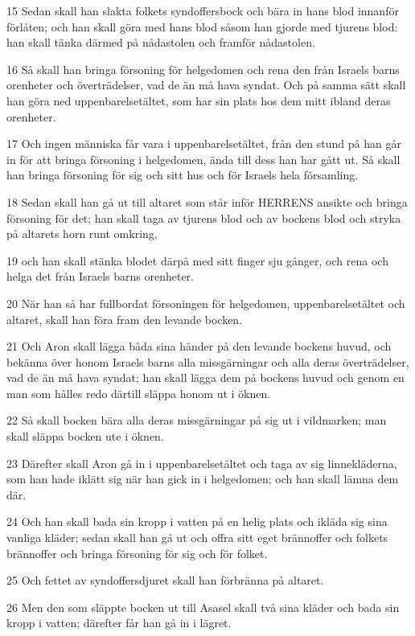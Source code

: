 \par 15 Sedan skall han slakta folkets syndoffersbock och bära in hans blod innanför förlåten; och han skall göra med hans blod såsom han gjorde med tjurens blod: han skall tänka därmed på nådastolen och framför nådastolen.
\par 16 Så skall han bringa försoning för helgedomen och rena den från Israels barns orenheter och överträdelser, vad de än må hava syndat. Och på samma sätt skall han göra ned uppenbarelsetältet, som har sin plats hos dem mitt ibland deras orenheter.
\par 17 Och ingen människa får vara i uppenbarelsetältet, från den stund på han går in för att bringa försoning i helgedomen, ända till dess han har gått ut. Så skall han bringa försoning för sig och sitt hus och för Israels hela församling.
\par 18 Sedan skall han gå ut till altaret som står inför HERRENS ansikte och bringa försoning för det; han skall taga av tjurens blod och av bockens blod och stryka på altarets horn runt omkring,
\par 19 och han skall stänka blodet därpå med sitt finger sju gånger, och rena och helga det från Israels barns orenheter.
\par 20 När han så har fullbordat försoningen för helgedomen, uppenbarelsetältet och altaret, skall han föra fram den levande bocken.
\par 21 Och Aron skall lägga båda sina händer på den levande bockens huvud, och bekänna över honom Israels barns alla missgärningar och alla deras överträdelser, vad de än må hava syndat; han skall lägga dem på bockens huvud och genom en man som hålles redo därtill släppa honom ut i öknen.
\par 22 Så skall bocken bära alla deras missgärningar på sig ut i vildmarken; man skall släppa bocken ute i öknen.
\par 23 Därefter skall Aron gå in i uppenbarelsetältet och taga av sig linnekläderna, som han hade iklätt sig när han gick in i helgedomen; och han skall lämna dem där.
\par 24 Och han skall bada sin kropp i vatten på en helig plats och ikläda sig sina vanliga kläder; sedan skall han gå ut och offra sitt eget brännoffer och folkets brännoffer och bringa försoning för sig och för folket.
\par 25 Och fettet av syndoffersdjuret skall han förbränna på altaret.
\par 26 Men den som släppte bocken ut till Asasel skall två sina kläder och bada sin kropp i vatten; därefter får han gå in i lägret.
